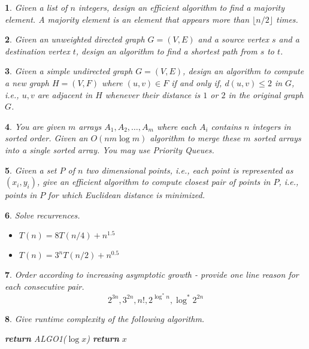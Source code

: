 \documentclass[%
addpoints]{exam}
\theoremstyle{problem}
\newtheorem{p}{}
\begin{document}
\begin{p}
Given a list of $n$ integers, design an efficient algorithm to find a \textit{majority} element. A majority element is an element that appears more than $\lfloor{n/2}\rfloor$ times.
\hfill \end{p}

\begin{p}
Given an unweighted directed graph $G=(V,E)$ and a source vertex $s$ and a destination vertex $t$, design an algorithm to find a shortest path from $s$ to $t$.
\hfill \end{p}

\begin{p}
Given a simple undirected graph $G=(V,E)$, design an algorithm to compute a new graph $H = (V,F)$ where $(u,v)\in F$ \textit{if and only if}, $d(u,v)\le 2$ in $G$, i.e., $u,v$ are adjacent in $H$ whenever their distance is $1$ or $2$ in the original graph $G$.
\hfill \end{p}

\begin{p}
You are given $m$ arrays $A_1, A_2,\ldots, A_m$ where each $A_i$ contains $n$ integers in sorted order. Given an $O(nm\log m)$ algorithm to merge these $m$ sorted arrays into a single sorted array. You may use Priority Queues.
\hfill \end{p}

\begin{p}
Given a set $P$ of $n$ two dimensional points, i.e., each point is represented as $(x_i,y_i)$, give an efficient algorithm to compute closest pair of points in $P$, i.e., points in $P$ for which Euclidean distance is minimized.
\hfill \end{p}

\begin{p}
Solve recurrences.
\hfill \end{p}
\begin{itemize}
			\item $T(n) = 8T(n/4) + n^{1.5}$
			\item $T(n) = 3^nT(n/2) + n^{0.5}$
\end{itemize}

\begin{p}
Order according to increasing asymptotic growth - provide one line reason for each consecutive pair.
\[
2^{3n},3^{2n},n!,2^{\log^*n},\log^* 2^{2n}
\]
\hfill \end{p}

\begin{p}
Give runtime complexity of the following algorithm.
\begin{algorithm}[!ht]
	\label{algo1}
	\begin{algorithmic}
		 
		\State \textbf{return} ALGO1($\log{x}$)
		\Else
		\State \textbf{return} $x$
		\EndIf
		\EndProcedure
	\end{algorithmic}
\end{algorithm}
\hfill \end{p}
\end{document}
